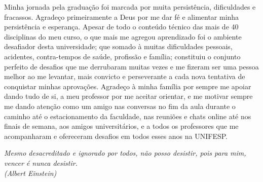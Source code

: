 \documentclass[	12pt, Times, openright, twoside, a4paper, english, brazil]{abntex2}
\begin{document}
    \begin{agradecimentos}
    Minha jornada pela graduação foi marcada por muita persistência, dificuldades e fracassos. Agradeço primeiramente a Deus por me dar fé e alimentar minha persistência e esperança. Apesar de todo o conteúdo técnico das mais de 40 disciplinas do meu curso, o que mais me agregou aprendizado foi o ambiente desafiador desta universidade; que somado à muitas dificuldades pessoais, acidentes, contra-tempos de saúde, profissão e família; constituiu o conjunto perfeito de desafios que me derrubaram muitas vezes e me fizeram ser uma pessoa melhor ao me levantar, mais convicto e perseverante a cada nova tentativa de conquistar minhas aprovações. Agradeço à minha família por sempre me apoiar dando tudo de si, a meu professor por me aceitar orientar, e me motivar sempre me dando atenção como um amigo nas conversas no fim da aula durante o caminho até o estacionamento da faculdade, nas reuniões e chats online até nos finais de semana, aos amigos universitários, e a todos os professores que me acompanharam e ofereceram desafios em todos esses anos na UNIFESP. 

    \end{agradecimentos}

    \begin{epigrafe}
        \vspace*{\fill}
    	\begin{flushright}
    		\textit{Mesmo desacreditado e ignorado por todos, não posso desistir, pois para mim, vencer é nunca desistir.\\
    		(Albert Einstein)}
    	\end{flushright}
    \end{epigrafe}

\end{document}
